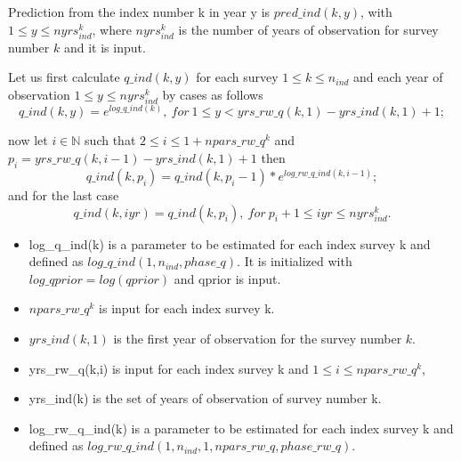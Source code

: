 \documentclass{article}
\begin{document}
Prediction from the index number k in year y is $pred\_ind(k,y)$, with $1\leq y \leq nyrs_{ind}^k$, where $nyrs_{ind}^k$ is the number of years of observation for survey number $k$ and it is input.

Let us first calculate $q\_ind(k,y)$ for each survey $1\leq k \leq n_{ind}$ and each year of observation $1\leq y \leq nyrs_{ind}^k$ by cases as follows
\begin{equation}
q\_ind(k,y)=e^{log\_q\_ind(k)}, \ for \ 1\leq y < yrs\_rw\_q(k,1)-yrs\_ind(k,1)+1;
\end{equation}

now let $i\in\mathbb{N}$ such that $2\leq i \leq 1+npars\_rw\_q^k$ and $p_i=yrs\_rw\_q(k,i-1)-yrs\_ind(k,1)+1$ then
\begin{equation}
     q\_ind(k,p_i)  = q\_ind(k,p_i-1)*e^{log\_rw\_q\_ind(k,i-1)};
\end{equation}
and for the last case
\begin{equation}
    q\_ind(k,iyr)  = q\_ind(k,p_i), \ for \ p_i+1\leq iyr \leq nyrs_{ind}^k.
\end{equation}

\begin{itemize}
    \item log\_q\_ind(k) is a parameter to be estimated for each index survey k and defined as $log\_q\_ind(1,n_{ind},phase\_q)$. It is initialized with $log\_qprior=log(qprior)$ and qprior is input.
    \item $npars\_rw\_q^k$ is input for each index survey k.
    \item $yrs\_ind(k,1)$ is the first year of observation for the survey number $k$.
    \item yrs\_rw\_q(k,i) is input for each index survey k and $1\leq i \leq npars\_rw\_q^k$, %
    \item yrs\_ind(k) is the set of years of observation of survey number k. 
    \item log\_rw\_q\_ind(k) is a parameter to be estimated for each index survey k and defined as $log\_rw\_q\_ind(1,n_{ind},1,npars\_rw\_q,phase\_rw\_q) $.
\end{itemize}
\end{document}

